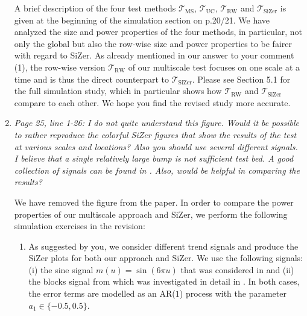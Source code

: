 \documentclass[a4paper,12pt]{article}
\begin{document}
\begin{enumerate}[label=(\arabic*),leftmargin=0.7cm]
\begin{itemize}[leftmargin=0.5cm,itemsep=0cm]
\end{itemize}
A brief description of the four test methods $\mathcal{T}_{\text{MS}}$, $\mathcal{T}_{\text{UC}}$, $\mathcal{T}_{\text{RW}}$ and $\mathcal{T}_{\text{SiZer}}$ is given at the beginning of the simulation section on p.20/21. We have analyzed the size and power properties of the four methods, in particular, not only the global but also the row-wise size and power properties to be fairer with regard to SiZer. As already mentioned in our answer to your comment (1), the row-wise version $\mathcal{T}_{\text{RW}}$ of our multiscale test focuses on one scale at a time and is thus the direct counterpart to $\mathcal{T}_{\text{SiZer}}$. Please see Section 5.1 for the full simulation study, which in particular shows how $\mathcal{T}_{\text{RW}}$ and $\mathcal{T}_{\text{SiZer}}$ compare to each other. We hope you find the revised study more accurate.


\item \textit{Page 25, line 1-26: I do not quite understand this figure. Would it be possible to rather reproduce the colorful SiZer figures that show the results of the test at various scales and locations? Also you should use several different signals. I believe that a single relatively large bump is not sufficient test bed. A good collection of signals can be found in \cite{DonohoJohnstone1995}. Also, would \cite{HannigLeePark2013} be helpful in comparing the results?}

We have removed the figure from the paper. In order to compare the power properties of our multiscale approach and SiZer, we perform the following simulation exercises in the revision:
\begin{enumerate}[label=(\alph*), leftmargin=0.7cm]

\item As suggested by you, we consider different trend signals and produce the SiZer plots for both our approach and SiZer. We use the following signals: (i) the sine signal $m(u) = \sin(6\pi u)$ that was considered in \cite{ParkHannigKang2009} and (ii) the blocks signal from \cite{DonohoJohnstone1995} which was investigated in detail in \cite{HannigMarron2006}. In both cases, the error terms are modelled as an AR($1$) process with the parameter $a_1 \in\{-0.5,0.5\}$. 


\end{enumerate}
\end{enumerate}
\end{document}
